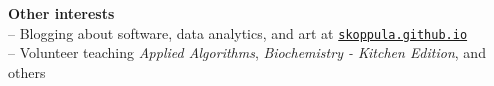 \documentclass[letterpaper,11pt]{article}
\begin{document}
\vspace{0.1in}
\large \textbf{Other interests\vspace{1mm}} \normalsize \\
\hspace{2mm} -- Blogging about software, data analytics, and art at \href{http://www.skoppula.github.io}{\nolinkurl{skoppula.github.io}}\\
\hspace{2mm} -- Volunteer teaching \textit{Applied Algorithms}, \textit{Biochemistry - Kitchen Edition}, and others \\ 
\end{document}
